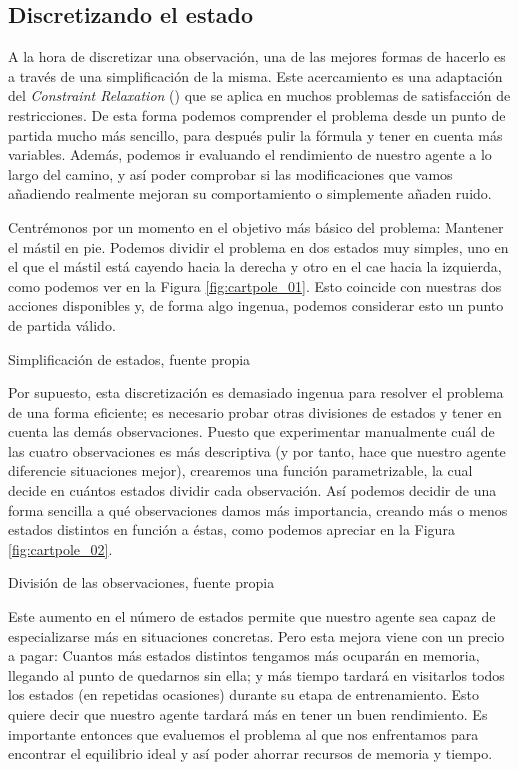 \subsection{Discretizando el estado}
A la hora de discretizar una observación, una de las mejores formas de hacerlo es a través de una simplificación de la misma. Este acercamiento es una adaptación del \textit{Constraint Relaxation} (\citet{rardin1998optimization}) que se aplica en muchos problemas de satisfacción de restricciones. De esta forma podemos comprender el problema desde un punto de partida mucho más sencillo, para después pulir la fórmula y tener en cuenta más variables. Además, podemos ir evaluando el rendimiento de nuestro agente a lo largo del camino, y así poder comprobar si las modificaciones que vamos añadiendo realmente mejoran su comportamiento o simplemente añaden ruido.

Centrémonos por un momento en el objetivo más básico del problema: Mantener el mástil en pie. Podemos dividir el problema en dos estados muy simples, uno en el que el mástil está cayendo hacia la derecha y otro en el cae hacia la izquierda, como podemos ver en la Figura \ref{fig:cartpole_01}. Esto coincide con nuestras dos acciones disponibles y, de forma algo ingenua, podemos considerar esto un punto de partida válido.

%
       {Simplificación de estados, fuente propia}

Por supuesto, esta discretización es demasiado ingenua para resolver el problema de una forma eficiente; es necesario probar otras divisiones de estados y tener en cuenta las demás observaciones. Puesto que experimentar manualmente cuál de las cuatro observaciones es más descriptiva (y por tanto, hace que nuestro agente diferencie situaciones mejor), crearemos una función parametrizable, la cual decide en cuántos estados dividir cada observación. Así podemos decidir de una forma sencilla a qué observaciones damos más importancia, creando más o menos estados distintos en función a éstas, como podemos apreciar en la Figura \ref{fig:cartpole_02}.

%
       {División de las observaciones, fuente propia}

Este aumento en el número de estados permite que nuestro agente sea capaz de especializarse más en situaciones concretas. Pero esta mejora viene con un precio a pagar: Cuantos más estados distintos tengamos más ocuparán en memoria, llegando al punto de quedarnos sin ella; y más tiempo tardará en visitarlos todos los estados (en repetidas ocasiones) durante su etapa de entrenamiento. Esto quiere decir que nuestro agente tardará más en tener un buen rendimiento. Es importante entonces que evaluemos el problema al que nos enfrentamos para encontrar el equilibrio ideal y así poder ahorrar recursos de memoria y tiempo.


